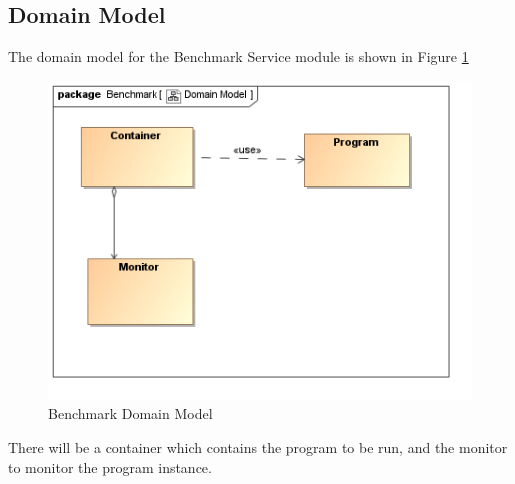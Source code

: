 \subsection{Domain Model}
The domain model for the Benchmark Service module is shown in Figure \ref{Benchmark Domain Model}
\begin{figure}[H]
  \begin{center}
  \includegraphics[scale=1.0]{../Diagrams and Charts/Benchmark/Domain Model.png}
  \caption{Benchmark Domain Model}
  \end{center}
  \label{Benchmark Domain Model}
\end{figure}
There will be a container which contains the program to be run, and the monitor to monitor the program instance.\\
